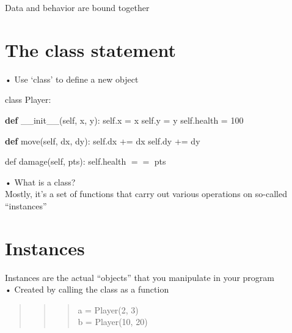 \documentclass[
  letterpaper,
  DIV=11,
  numbers=noendperiod]{scrreprt}
\newenvironment{Shaded}{\begin{snugshade}}{\end{snugshade}}
\newcommand{\DecValTok}[1]{\textcolor[rgb]{0.68,0.00,0.00}{#1}}
\newcommand{\FunctionTok}[1]{\textcolor[rgb]{0.28,0.35,0.67}{#1}}
\newcommand{\KeywordTok}[1]{\textcolor[rgb]{0.00,0.23,0.31}{\textbf{#1}}}
\newcommand{\NormalTok}[1]{\textcolor[rgb]{0.00,0.23,0.31}{#1}}
\newcommand{\OperatorTok}[1]{\textcolor[rgb]{0.37,0.37,0.37}{#1}}
\newcommand{\VariableTok}[1]{\textcolor[rgb]{0.07,0.07,0.07}{#1}}
\begin{document}
Data and behavior are bound together


\chapter{The class statement}\label{the-class-statement}

• Use `class' to define a new object

class Player:

\begin{Shaded}
\begin{Highlighting}[]
\KeywordTok{def} \FunctionTok{\_\_init\_\_}\NormalTok{(}\VariableTok{self}\NormalTok{, x, y):}
    \VariableTok{self}\NormalTok{.x }\OperatorTok{=}\NormalTok{ x}
    \VariableTok{self}\NormalTok{.y }\OperatorTok{=}\NormalTok{ y}
    \VariableTok{self}\NormalTok{.health }\OperatorTok{=} \DecValTok{100} 
\end{Highlighting}
\end{Shaded}

\begin{Shaded}
\begin{Highlighting}[]
\KeywordTok{def}\NormalTok{ move(}\VariableTok{self}\NormalTok{, dx, dy):}
    \VariableTok{self}\NormalTok{.dx }\OperatorTok{+=}\NormalTok{ dx}
    \VariableTok{self}\NormalTok{.dy }\OperatorTok{+=}\NormalTok{ dy }
\end{Highlighting}
\end{Shaded}

def damage(self, pts): self.health \(= =\) pts

• What is a class?\\
Mostly, it's a set of functions that carry out various operations on
so-called ``instances''


\chapter{Instances}\label{instances-1}

Instances are the actual ``objects'' that you manipulate in your
program\\
• Created by calling the class as a function

\begin{quote}
\begin{quote}
\begin{quote}
a = Player(2, 3)\\
b = Player(10, 20)
\end{quote}
\end{quote}
\end{quote}
\end{document}
